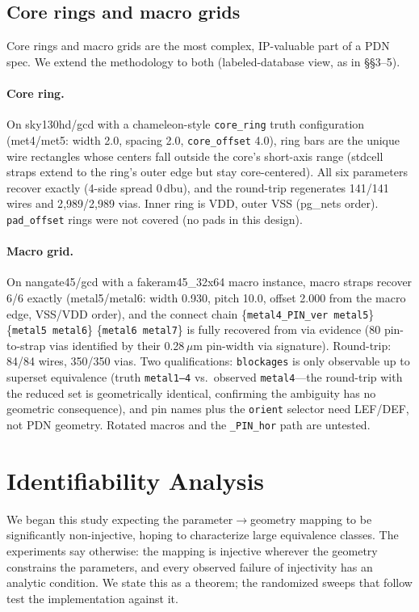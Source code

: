 \documentclass[11pt]{article}
\begin{document}
\subsection{Core rings and macro grids}
\label{sec:ringmacro}

Core rings and macro grids are the most complex, IP-valuable part of a
PDN spec.  We extend the methodology to both (labeled-database view, as
in \S\S3--5).

\paragraph{Core ring.} On sky130hd/gcd with a chameleon-style
\texttt{core\_ring} truth configuration (met4/met5: width 2.0, spacing
2.0, \texttt{core\_offset} 4.0), ring bars are the unique wire
rectangles whose centers fall outside the core's short-axis range
(stdcell straps extend to the ring's outer edge but stay core-centered).
All six parameters recover exactly (4-side spread 0\,dbu), and the
round-trip regenerates 141/141 wires and 2{,}989/2{,}989 vias.  Inner
ring is VDD, outer VSS (pg\_nets order).  \texttt{pad\_offset} rings were
not covered (no pads in this design).

\paragraph{Macro grid.} On nangate45/gcd with a fakeram45\_32x64 macro
instance, macro straps recover 6/6 exactly (metal5/metal6: width 0.930,
pitch 10.0, offset 2.000 from the macro edge, VSS/VDD order), and the
connect chain \{\texttt{metal4\_PIN\_ver metal5}\}
\{\texttt{metal5 metal6}\} \{\texttt{metal6 metal7}\} is fully recovered
from via evidence (80 pin-to-strap vias identified by their 0.28\,$\mu$m
pin-width via signature).  Round-trip: 84/84 wires, 350/350 vias.
Two qualifications: \texttt{blockages} is only observable up to
superset equivalence (truth \texttt{metal1--4} vs.\ observed
\texttt{metal4}---the round-trip with the reduced set is geometrically
identical, confirming the ambiguity has no geometric consequence), and
pin names plus the \texttt{orient} selector need LEF/DEF, not PDN
geometry.  Rotated macros and the \texttt{\_PIN\_hor} path are untested.

\section{Identifiability Analysis}
\label{sec:ident}

We began this study expecting the parameter$\to$geometry mapping to be
significantly non-injective, hoping to characterize large equivalence
classes.  The experiments say otherwise: the mapping is injective
wherever the geometry constrains the parameters, and every observed
failure of injectivity has an analytic condition.  We state this as a
theorem; the randomized sweeps that follow test the implementation
against it.
\end{document}
